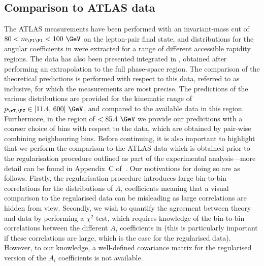 \subsection{Comparison to ATLAS data}
The ATLAS measurements have been performed with an invariant-mass cut of $80 < m_{\Pl\Pl} < 100~\GeV$
on the lepton-pair final state, and distributions for the angular coefficients in \ptz were extracted
for a range of different accessible rapidity regions. The data has also been presented integrated in \yz, 
obtained after performing an extrapolation to the full phase-space region. The comparison of the 
theoretical predictions is performed with respect to this data, referred to as \yz inclusive, for which 
the measurements are most precise.
%
The predictions of the various \ptz distributions are provided for the kinematic range of 
$\ptz \in [11.4,\,600]~\GeV$, and compared to the available data in this region. Furthermore, in the 
region of \ptz $< 85.4~\GeV$ we provide our predictions with a coarser choice of \ptz bins
with respect to the data, which are obtained by pair-wise combining neighbouring bins.
%
Before continuing, it is also important to highlight that we perform the comparison to the 
ATLAS data which is obtained prior to the regularisation procedure outlined as part of the experimental 
analysis---more detail can be found in Appendix~C of~\cite{Aad:2016izn}.
Our motivations for doing so are as follows. Firstly, the regularisation procedure introduces large
bin-to-bin correlations for the distributions of $A_i$ coefficients meaning that a visual comparison
to the regularised data can be misleading as large correlations are hidden from view. Secondly,
we wish to quantify the agreement between theory and data by performing a $\chi^2$ test, which
requires knowledge of the bin-to-bin correlations between the different $A_i$ coefficients in \ptz (this is 
particularly important if these correlations are large, which is the case for the regularised data). However, to our knowledge, 
a well-defined covariance matrix for the regularised version of the $A_i$ coefficients is not available.

